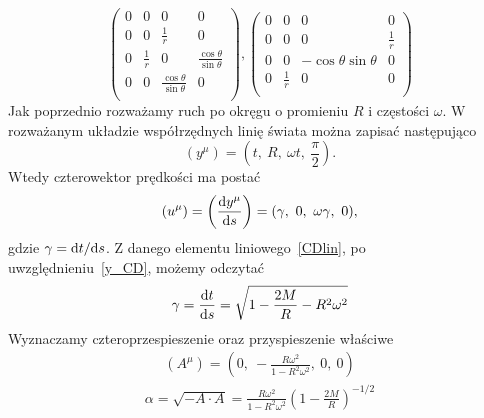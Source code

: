 $$
\left(
\begin{array}{cccc}
 0 & 0 & 0 & 0 \\
 0 & 0 & \frac{1}{r} & 0 \\
 0 & \frac{1}{r} & 0 & \frac{\cos \theta}{\sin\theta}  \\
 0 & 0 &\frac{ \cos \theta }{\sin \theta }  & 0 \\
\end{array}
\right),\left(
\begin{array}{cccc}
 0 & 0 & 0 & 0 \\
 0 & 0 & 0 & \frac{1}{r} \\
 0 & 0 & -\cos \theta\sin \theta  & 0 \\
 0 & \frac{1}{r} & 0 & 0 \\
\end{array}
\right)
$$
Jak poprzednio rozważamy ruch po okręgu o promieniu $R$ i częstości $\omega$.
W rozważanym układzie współrzędnych linię świata można zapisać następująco
\begin{equation}\label{y_CD}
(y^\mu) = \left( t,\ R,\ \omega t,\ \frac{\pi}{2}\right).
\end{equation}
Wtedy czterowektor prędkości ma postać
\begin{equation}\nonumber
(u^\mu) = \left( \frac{\text{d} y^\mu}{\text{d} s} \right) 
= (\gamma,\ 0,\ \omega\gamma,\ 0),
\end{equation}
gdzie $\gamma = \text{d} t/\text{d} s$. Z danego elementu liniowego~\eqref{CDlin}, 
po uwzględnieniu~\eqref{y_CD}, możemy odczytać 
\begin{align}\nonumber
\gamma = \frac{\text{d} t}{\text{d} s} = 
\sqrt{ 1 - \frac{2 M}{R} - R^2\omega^2 }
\end{align}
Wyznaczamy czteroprzespieszenie oraz przyspieszenie właściwe
\begin{align}\nonumber
(A^\mu) = \left(0,\ -\frac{R\omega^2}{1-R^2\omega^2},\ 0,\ 0 \right)
\end{align}
\begin{align}\nonumber
\alpha = \sqrt{-A\cdot A} = \frac{R\omega^2}{1-R^2\omega^2} 
\left( 1-\frac{2M}{R} \right)^{-1/2}
\end{align}

